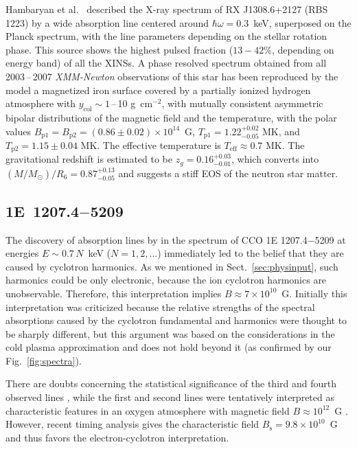 \documentclass{pos1}
\newcommand{\Teff}{T_\mathrm{eff}}
\newcommand{\ycol}{y_\mathrm{col}}
\begin{document}
Hambaryan et al.~\cite{Hambaryan_ea11} described the
X-ray spectrum of RX J1308.6+2127 (RBS 1223) by a
wide absorption line centered around $\hbar\omega=0.3$~keV, superposed
on the Planck spectrum, with the line parameters depending on the
stellar rotation phase. This source shows the highest pulsed fraction
($13-42$\%, depending on energy band) of all the XINSs. A phase
resolved spectrum obtained from all 2003\,--\,2007 \textit{XMM-Newton}
observations of this star has been reproduced by the model a
magnetized iron surface covered by a partially ionized hydrogen
atmosphere with $\ycol\sim1$\,--\,10 g~cm$^{-2}$, with mutually
consistent asymmetric bipolar distributions of the magnetic field and
the temperature, with the polar values
$B_\mathrm{p1}=B_\mathrm{p2}=(0.86\pm0.02)\times10^{14}$~G,
$T_\mathrm{p1}=1.22^{+0.02}_{-0.05}$ MK, and
$T_\mathrm{p2}=1.15\pm0.04$ MK. The effective temperature is 
$\Teff\approx0.7$ MK. The gravitational redshift is estimated to be
$z_g=0.16^{+0.03}_{-0.01}$, which converts into
$(M/M_\odot)/R_6=0.87^{+0.13}_{-0.05}$ and suggests a stiff EOS of the
neutron star matter.

\subsection{1E~1207.4$-$5209}

The discovery of absorption lines
by \cite{Sanwal_ea02,Bignami_ea03} in the spectrum of CCO 1E
1207.4$-$5209 at energies $E\sim0.7\,N$~keV ($N=1,2,\ldots$)
immediately led to the belief that they are caused by
cyclotron harmonics. As we mentioned in
Sect.~\ref{sec:physinput}, such harmonics could be only electronic,
because the ion cyclotron harmonics are unobservable. Therefore, this
interpretation implies $B\approx7\times10^{10}$~G. Initially this interpretation
was criticized because the relative strengths of the spectral absorptions caused
by the cyclotron fundamental and
harmonics were thought to be sharply different, but this argument
was based on the considerations in the cold plasma approximation and
does not hold beyond it \cite{SuleimanovPW12} (as confirmed by
our Fig.~\ref{fig:spectra}).

There are doubts concerning the statistical significance of the third
and fourth observed lines \cite{MoriCH}, while the first and second
lines were tentatively interpreted as characteristic features in an
oxygen atmosphere with magnetic field $B\approx10^{12}$~G
\cite{MoriHailey06}. However, recent timing analysis
\cite{HalpernGotthelf15} gives the characteristic field
$B_\mathrm{s}=9.8\times10^{10}$~G and thus favors the
electron-cyclotron interpretation.
\end{document}
